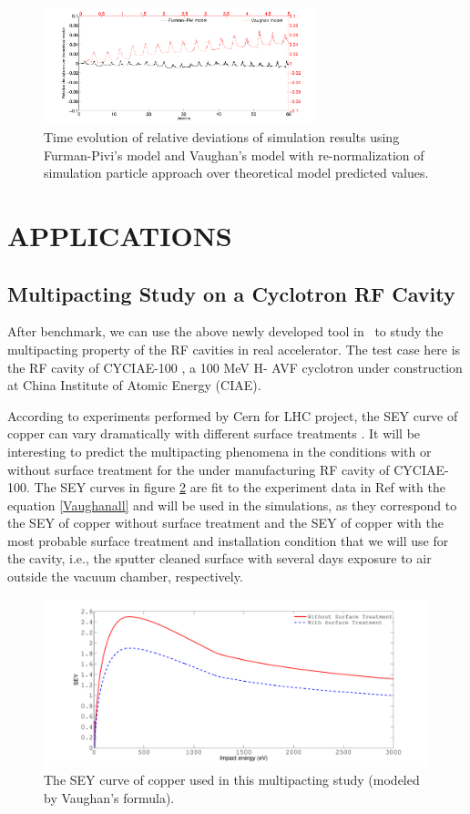 \documentclass[aps,prstab,superscriptaddress,showpacs]{revtex4-1}
\begin{document}
\begin{figure}[H]
\begin{center}
\includegraphics[width=0.7\textwidth]{figures/models_comp_const_part.pdf}
\end{center}
\caption{Time evolution of relative deviations of simulation results using Furman-Pivi's model and Vaughan's model with re-normalization of simulation particle approach over theoretical model predicted values. \label{fig:const_de}}
\end{figure}
\section{APPLICATIONS}
\subsection{Multipacting Study on a Cyclotron RF Cavity}
After benchmark, we can use the above newly developed tool in \opal\ to study the multipacting property of the RF cavities in real accelerator. The test case here is the RF cavity of CYCIAE-100 \cite{Zhang20084117}, a 100 MeV H- AVF cyclotron under construction at China Institute of Atomic Energy (CIAE). 

According to experiments performed by Cern for LHC project, the SEY curve of copper can vary dramatically with different surface treatments \cite{seycurve}. It will be interesting to predict the multipacting phenomena in the conditions with or without surface treatment for the under manufacturing RF cavity of CYCIAE-100. The SEY curves in figure \ref{fig:sey} are fit to the experiment data in Ref \cite{seycurve} with the equation \eqref{Vaughanall} and will be used in the simulations, as they correspond to the SEY of copper without surface treatment and the SEY of copper with the most probable surface treatment and installation condition that we will use for the cavity, i.e., the sputter cleaned surface with several days exposure to air outside the vacuum chamber, respectively.   
\begin{figure}[H]
   \centering
  \includegraphics*[width=0.7\linewidth,angle=0]{figures/diff_SEYCurve.pdf}
   \caption{The SEY curve of copper used in this multipacting study (modeled by Vaughan's formula).}
   \label{fig:sey}
\end{figure}
\end{document}
